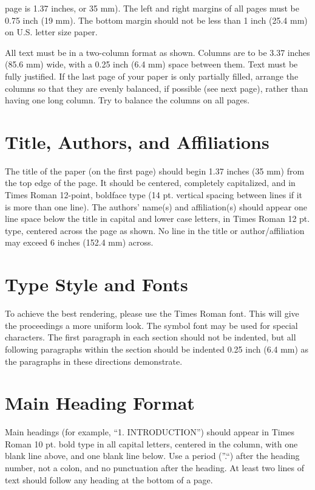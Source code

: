 \documentclass[letterpaper,10pt,twocolumn]{article} %
\begin{document}
page is 1.37 inches, or 35 mm). 
The left and right margins of all pages must be 0.75 inch (19 mm). 
The bottom margin should not be less than 1 inch (25.4 mm) on U.S. letter size paper. 

All text must be in a two-column format as shown. 
Columns are to be 3.37 inches (85.6 mm) wide, with a 0.25 inch (6.4 mm) space between them. 
Text must be fully justified. 
If the last page of your paper is only partially filled, arrange the columns so that they are evenly balanced, if possible (see next page), rather than having one long column. 
Try to balance the columns on all pages.

\section{Title, Authors, and Affiliations}

The title of the paper (on the first page) should begin 1.37 inches (35 mm) from the top edge of the page. 
It should be centered, completely capitalized, and in Times Roman 12-point, boldface type (14 pt. vertical spacing between lines if it is more than one line). 
The authors' name(s) and affiliation(s) should appear one line space below the title in capital and lower case letters, in Times Roman 12 pt. type, centered across the page as shown. 
No line in the title or author/affiliation may exceed 6 inches (152.4 mm) across. 

\section{Type Style and Fonts}

To achieve the best rendering, please use the Times Roman font. 
This will give the proceedings a more uniform look. 
The symbol font may be used for special characters. 
The first paragraph in each section should not be indented, but all following paragraphs within the section should be indented 0.25 inch (6.4 mm) as the paragraphs in these directions demonstrate.

\section{Main Heading Format}

Main headings (for example, ``1. INTRODUCTION'') should appear in Times Roman 10 pt. 
bold type in all capital letters, centered in the column, with one blank line above, and one blank line below. 
Use a period (''.``) after the heading number, not a colon, and no punctuation after the heading. 
At least two lines of text should follow any heading at the bottom of a page.
\end{document}
